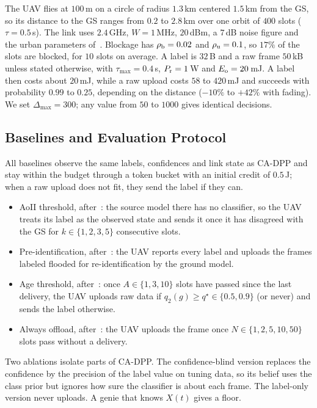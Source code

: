 \documentclass[conference]{IEEEtran}
\theoremstyle{remark}
\begin{document}
The UAV flies at $100$\,m on a circle of radius $1.3$\,km centered $1.5$\,km from the GS, so its distance to the GS ranges from $0.2$ to $2.8$\,km over one orbit of $400$ slots ($\tau=0.5$\,s). The link uses $2.4$\,GHz, $W=1$\,MHz, $20$\,dBm, a $7$\,dB noise figure and the urban parameters of~\cite{alhourani2014lap}. Blockage has $\rho_{\rm b}=0.02$ and $\rho_{\rm u}=0.1$, so $17\%$ of the slots are blocked, for $10$ slots on average. A label is $32$\,B and a raw frame $50$\,kB unless stated otherwise, with $\tau_{\max}=0.4$\,s, $P_{\rm r}=1$\,W and $E_{\rm o}=20$\,mJ. A label then costs about $20$\,mJ, while a raw upload costs $58$ to $420$\,mJ and succeeds with probability $0.99$ to $0.25$, depending on the distance ($-10\%$ to $+42\%$ with fading). We set $\Delta_{\max}=300$; any value from $50$ to $1000$ gives identical decisions.

\subsection{Baselines and Evaluation Protocol}
All baselines observe the same labels, confidences and link state as CA-DPP and stay within the budget through a token bucket with an initial credit of $0.5$\,J; when a raw upload does not fit, they send the label if they can. \begin{itemize}
\item AoII threshold, after~\cite{zakeri2023aoiieh}: the source model there has no classifier, so the UAV treats its label as the observed state and sends it once it has disagreed with the GS for $k\in\{1,2,3,5\}$ consecutive slots.
\item Pre-identification, after~\cite{gan2025taoi}: the UAV reports every label and uploads the frames labeled flooded for re-identification by the ground model.
\item Age threshold, after~\cite{pehlivanoglu2026orbit}: once $A\in\{1,3,10\}$ slots have passed since the last delivery, the UAV uploads raw data if $q_2(g)\ge q^\star\in\{0.5,0.9\}$ (or never) and sends the label otherwise.
\item Always offload, after~\cite{basnayaka2025aomi}: the UAV uploads the frame once $N\in\{1,2,5,10,50\}$ slots pass without a delivery.
\end{itemize}
Two ablations isolate parts of CA-DPP. The confidence-blind version replaces the confidence by the precision of the label value on tuning data, so its belief uses the class prior but ignores how sure the classifier is about each frame. The label-only version never uploads. A genie that knows $X(t)$ gives a floor.
\end{document}

